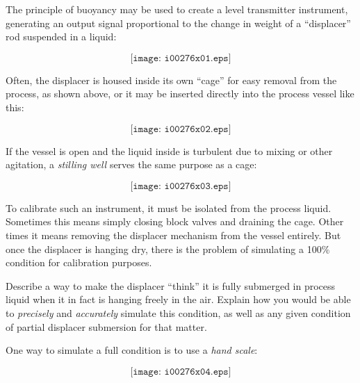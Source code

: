 

The principle of buoyancy may be used to create a level transmitter instrument, generating an output signal proportional to the change in weight of a ``displacer'' rod suspended in a liquid:

$$\texttt{[image: i00276x01.eps]}$$

Often, the displacer is housed inside its own ``cage'' for easy removal from the process, as shown above, or it may be inserted directly into the process vessel like this:

$$\texttt{[image: i00276x02.eps]}$$

If the vessel is open and the liquid inside is turbulent due to mixing or other agitation, a {\it stilling well} serves the same purpose as a cage:

$$\texttt{[image: i00276x03.eps]}$$

To calibrate such an instrument, it must be isolated from the process liquid.  Sometimes this means simply closing block valves and draining the cage.  Other times it means removing the displacer mechanism from the vessel entirely.  But once the displacer is hanging dry, there is the problem of simulating a 100\% condition for calibration purposes.

Describe a way to make the displacer ``think'' it is fully submerged in process liquid when it in fact is hanging freely in the air.  Explain how you would be able to {\it precisely} and {\it accurately} simulate this condition, as well as any given condition of partial displacer submersion for that matter.







One way to simulate a full condition is to use a {\it hand scale}:

$$\texttt{[image: i00276x04.eps]}$$











